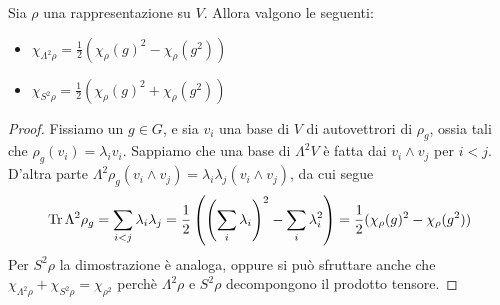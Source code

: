 \begin{myprop}
 Sia $\rho$ una rappresentazione su $V$. Allora valgono le seguenti:
 \begin{itemize}
  \item $\chi_{\Lambda^2 \rho} = \frac12 (\chi_\rho(g)^2 - \chi_\rho(g^2)) $
  \item $\chi_{S^2 \rho} = \frac12 (\chi_\rho(g)^2 + \chi_\rho(g^2)) $
 \end{itemize}
 
 \begin{proof}
  Fissiamo un $g \in G$, e sia $v_i$ una base di $V$ di autovettrori di $\rho_g$, ossia tali che $\rho_g(v_i)=\lambda_iv_i$. Sappiamo che una base di $\Lambda^2 V$ è fatta dai $v_i \wedge v_j$ per $i<j$. D'altra parte $\Lambda^2\rho_g (v_i\wedge v_j) = \lambda_i\lambda_j (v_i \wedge v_j)$, da cui segue
  \[
   \operatorname{Tr} \Lambda^2\rho_g = \sum_{i<j}\lambda_i\lambda_j = \frac12\left(\left(\sum_i \lambda_i\right)^2 - \sum_i \lambda_i^2\right) = \frac12 (\chi_\rho(g)^2 - \chi_\rho(g^2))
  \]
  Per $S^2\rho$ la dimostrazione è analoga, oppure si può sfruttare anche che $\chi_{\Lambda^2\rho}+\chi_{S^2\rho}=\chi_{\rho^2}$ perchè $\Lambda^2\rho$ e $S^2\rho$ decompongono il prodotto tensore.

 \end{proof}


\end{myprop}
